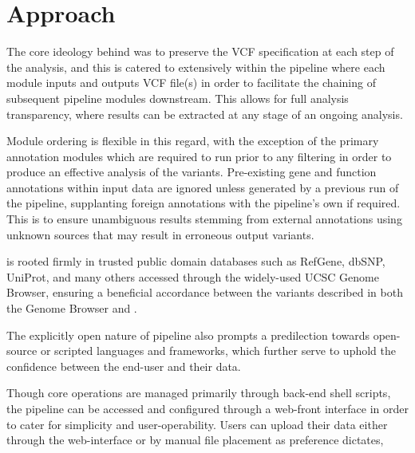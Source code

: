 
\section{Approach}

The core ideology behind \app was to preserve the VCF specification at each step of the analysis, and this is catered to extensively within the pipeline where each module inputs and outputs VCF file(s) in order to facilitate the chaining of subsequent pipeline modules downstream. This allows for full analysis transparency, where results can be extracted at any stage of an ongoing analysis. 

Module ordering is flexible in this regard, with the exception of the primary annotation modules which are required to run prior to any filtering in order to produce an effective analysis of the variants. Pre-existing gene and function annotations within input data are ignored unless generated by a previous run of the \app pipeline, supplanting foreign annotations with the pipeline's own if required. This is to ensure unambiguous results stemming from external annotations using unknown sources that may result in erroneous output variants.

\app is rooted firmly in trusted public domain databases such as RefGene, dbSNP, UniProt, and many others accessed through the widely-used UCSC Genome Browser, ensuring a beneficial accordance between the variants described in both the Genome Browser and \app.

The explicitly open nature of pipeline also prompts a predilection towards open-source or scripted languages and frameworks, which further serve to uphold the confidence between the end-user and their data.

Though core operations are managed primarily through back-end shell scripts, the pipeline can be accessed and configured through a web-front interface in order to cater for simplicity and user-operability. Users can upload their data either through the web-interface or by manual file placement as preference dictates,
